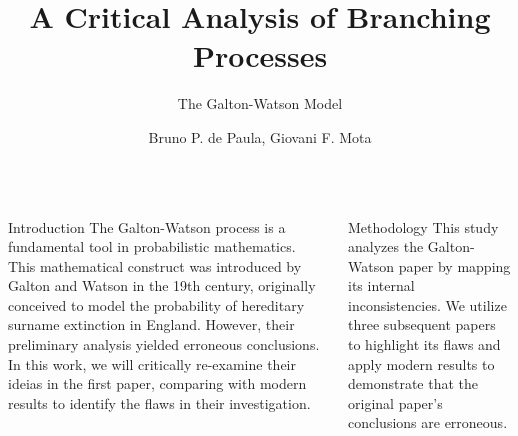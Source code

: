 \documentclass[palette=none,mode=dark]{impaTeXPoster}
\title{{\fontsize{60}{72}\selectfont A Critical Analysis of Branching Processes } }
\subtitle{The Galton-Watson Model}
\author{Bruno P. de Paula, Giovani F. Mota}
\begin{document}
\maketitle
\begin{columns}


\begin{postercard}{Introduction}
The Galton-Watson process is a fundamental tool in probabilistic mathematics. This mathematical construct was introduced by Galton and Watson in the 19th century, originally conceived to model the probability of hereditary surname extinction in England. However, their preliminary analysis yielded erroneous conclusions. In this work, we will critically re-examine their ideias in the first paper, comparing with modern results to identify the flaws in their investigation.
\end{postercard}

\begin{postercard}{Methodology}
This study analyzes the Galton-Watson paper by mapping its internal inconsistencies. We utilize three subsequent papers to highlight its flaws and apply modern results to demonstrate that the original paper's conclusions are erroneous.
\end{postercard}


\end{columns}
\end{document}
